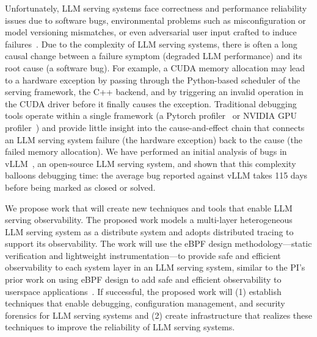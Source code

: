 Unfortunately, LLM serving systems face correctness and performance reliability issues due to software bugs, environmental problems such as misconfiguration or model versioning mismatches, or even adversarial user input crafted to induce failures~\cite{underwood_2022_mlservingfailures}.  Due to the complexity of LLM serving systems, there is often a long causal change between a failure symptom (\eg degraded LLM performance) and its root cause (\eg a software bug).  For example, a CUDA memory allocation may lead to a hardware exception by passing through the Python-based scheduler of the serving framework, the C++ backend, and by triggering an invalid operation in the CUDA driver before it finally causes the exception.  Traditional debugging tools operate within a single framework (\eg a Pytorch profiler~\cite{pytorchprofiler} or NVIDIA GPU profiler~\cite{nsightsystems}) and provide little insight into the cause-and-effect chain that connects an LLM serving system failure (\eg the hardware exception) back to the cause (\eg the failed memory allocation).  We have performed an initial analysis of bugs in vLLM~\cite{kwon2023pagedattention}, an open-source LLM serving system, and shown that this complexity balloons debugging time: the average bug reported against vLLM takes 115 days before being marked as closed or solved. 


We propose work that will create new techniques and tools that enable LLM serving observability.  The proposed work models a multi-layer heterogeneous LLM serving system as a distribute system and adopts  distributed tracing to support its observability.  The work will use the eBPF design methodology---static verification and lightweight instrumentation---to provide safe and efficient observability to each system layer in an LLM serving system, similar to the PI's prior work on using eBPF design to add safe and efficient observability to userspace applications~\cite{zheng2025extending}.  If successful, the proposed work will (1) establish techniques that enable debugging, configuration management, and security forensics for LLM serving systems and (2) create infrastructure that realizes these techniques to improve the reliability of LLM serving systems. 

